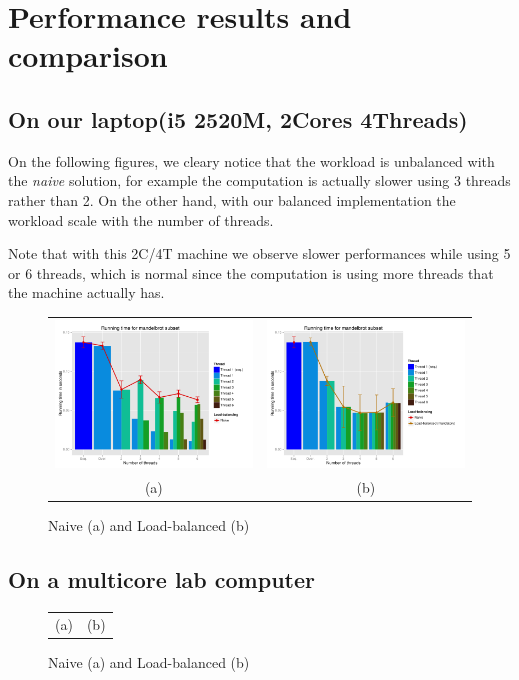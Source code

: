 \section*{Performance results and comparison}
\subsection*{On our laptop(i5 2520M, 2Cores 4Threads)}

On the following figures, we cleary notice that the workload is unbalanced
with the \textit{naive} solution, for example the computation is actually
slower using 3 threads rather than 2.
On the other hand, with our balanced implementation the workload 
scale with the number of threads.

Note that with this 2C/4T machine we observe slower performances while 
using 5 or 6 threads, which is normal since the computation is using more 
threads that the machine actually has.

\begin{figure}[h]
    \centering
    \begin{tabular}{cc}
 \includegraphics[width=.50\linewidth,scale=1]{./images/2.png} &
 \includegraphics[width=.50\linewidth, scale=1.5]{./images/3.png} \\
      (a) & (b)
    \end{tabular}
    \caption{Naive (a) and Load-balanced (b)}
\end{figure}

\subsection*{On a multicore lab computer}


\begin{figure}[h]
    \centering
    \begin{tabular}{cc}
      (a) & (b)
    \end{tabular}
    \caption{Naive (a) and Load-balanced (b)}
\end{figure}








